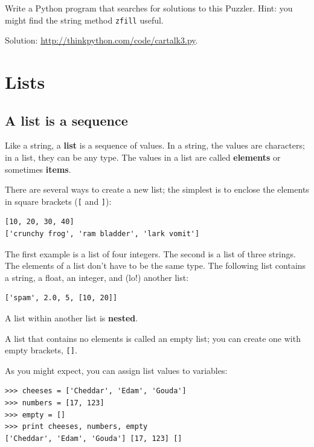 \documentclass[10pt]{book}
\begin{document}
\begin{CJK}{UTF8}{gbsn}
\begin{exercise}
\begin{quote}
\end{quote}

Write a Python program that searches for solutions to this Puzzler.
Hint: you might find the string method {\tt zfill} useful.

Solution: \url{http://thinkpython.com/code/cartalk3.py}.

\end{exercise}



\chapter{Lists}

\section{A list is a sequence}
\label{sequence}

Like a string, a {\bf list} is a sequence of values.  In a string, the
values are characters; in a list, they can be any type.  The values in
a list are called {\bf elements} or sometimes {\bf items}.

There are several ways to create a new list; the simplest is to
enclose the elements in square brackets (\verb"[" and \verb"]"):

\begin{verbatim}
[10, 20, 30, 40]
['crunchy frog', 'ram bladder', 'lark vomit']
\end{verbatim}
%
The first example is a list of four integers.  The second is a list of
three strings.  The elements of a list don't have to be the same type.
The following list contains a string, a float, an integer, and
(lo!) another list:

\begin{verbatim}
['spam', 2.0, 5, [10, 20]]
\end{verbatim}
%
A list within another list is {\bf nested}.

A list that contains no elements is
called an empty list; you can create one with empty
brackets, \verb"[]".

As you might expect, you can assign list values to variables:

\begin{verbatim}
>>> cheeses = ['Cheddar', 'Edam', 'Gouda']
>>> numbers = [17, 123]
>>> empty = []
>>> print cheeses, numbers, empty
['Cheddar', 'Edam', 'Gouda'] [17, 123] []
\end{verbatim}
%



\end{CJK}
\end{document}
